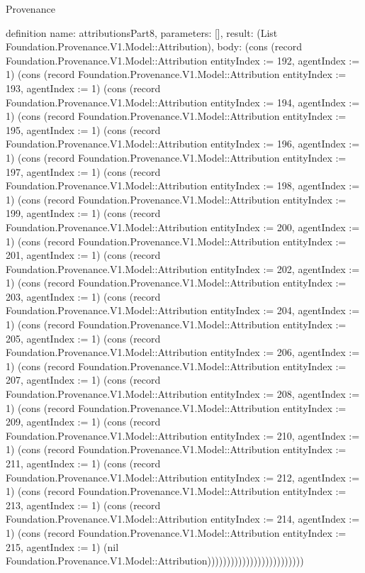 \begin{lexlean}{Provenance}
\begin{semanticmodule}
definition{
  name: attributionsPart8,
  parameters: [],
  result: (List Foundation.Provenance.V1.Model::Attribution),
  body: (cons (record Foundation.Provenance.V1.Model::Attribution {entityIndex := 192, agentIndex := 1}) (cons (record Foundation.Provenance.V1.Model::Attribution {entityIndex := 193, agentIndex := 1}) (cons (record Foundation.Provenance.V1.Model::Attribution {entityIndex := 194, agentIndex := 1}) (cons (record Foundation.Provenance.V1.Model::Attribution {entityIndex := 195, agentIndex := 1}) (cons (record Foundation.Provenance.V1.Model::Attribution {entityIndex := 196, agentIndex := 1}) (cons (record Foundation.Provenance.V1.Model::Attribution {entityIndex := 197, agentIndex := 1}) (cons (record Foundation.Provenance.V1.Model::Attribution {entityIndex := 198, agentIndex := 1}) (cons (record Foundation.Provenance.V1.Model::Attribution {entityIndex := 199, agentIndex := 1}) (cons (record Foundation.Provenance.V1.Model::Attribution {entityIndex := 200, agentIndex := 1}) (cons (record Foundation.Provenance.V1.Model::Attribution {entityIndex := 201, agentIndex := 1}) (cons (record Foundation.Provenance.V1.Model::Attribution {entityIndex := 202, agentIndex := 1}) (cons (record Foundation.Provenance.V1.Model::Attribution {entityIndex := 203, agentIndex := 1}) (cons (record Foundation.Provenance.V1.Model::Attribution {entityIndex := 204, agentIndex := 1}) (cons (record Foundation.Provenance.V1.Model::Attribution {entityIndex := 205, agentIndex := 1}) (cons (record Foundation.Provenance.V1.Model::Attribution {entityIndex := 206, agentIndex := 1}) (cons (record Foundation.Provenance.V1.Model::Attribution {entityIndex := 207, agentIndex := 1}) (cons (record Foundation.Provenance.V1.Model::Attribution {entityIndex := 208, agentIndex := 1}) (cons (record Foundation.Provenance.V1.Model::Attribution {entityIndex := 209, agentIndex := 1}) (cons (record Foundation.Provenance.V1.Model::Attribution {entityIndex := 210, agentIndex := 1}) (cons (record Foundation.Provenance.V1.Model::Attribution {entityIndex := 211, agentIndex := 1}) (cons (record Foundation.Provenance.V1.Model::Attribution {entityIndex := 212, agentIndex := 1}) (cons (record Foundation.Provenance.V1.Model::Attribution {entityIndex := 213, agentIndex := 1}) (cons (record Foundation.Provenance.V1.Model::Attribution {entityIndex := 214, agentIndex := 1}) (cons (record Foundation.Provenance.V1.Model::Attribution {entityIndex := 215, agentIndex := 1}) (nil Foundation.Provenance.V1.Model::Attribution)))))))))))))))))))))))))
}


\end{semanticmodule}
\end{lexlean}
